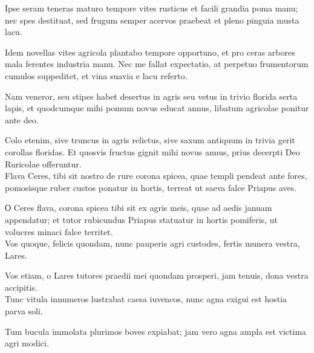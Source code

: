 {\large

\noindent Ipse seram teneras maturo tempore vites rusticus et facili grandia poma manu; nec spes destituat, sed frugum semper acervos praebeat et pleno pinguia musta lacu.\\

}

\noindent Idem novellas vites agricola plantabo tempore opportuno, et pro ceras arbores mala ferentes industria manu. Nec me fallat expectatio, at perpetuo frumentorum cumulos suppeditet, et vina suavia e lacu referto.\\

{\large

\noindent Nam veneror, seu stipes habet desertus in agris seu vetus in trivio florida serta lapis, et quodcumque mihi pomum novus educat annus, libatum agricolae ponitur ante deo.\\

}

\noindent Colo etenim, sive truncus in agris relictus, sive saxum antiquum in trivia gerit corollas floridas. Et quosvis fructus gignit mihi novus annus, prius decerpti Deo Ruricolae offeruntur. \\


{\large
\noindent Flava Ceres, tibi sit nostro de rure corona spicea, quae templi pendeat ante fores, pomosisque ruber custos ponatur in hortis, terreat ut saeva falce Priapus aves.\\

}


\noindent О Ceres flava, corona spicea tibi sit ex agris meis, quae ad aedis januam appendatur; et tutor rubicundus Priapus statuatur in hortis pomiferis, ut volucres minaci falce territet.\\ 

{\large
\noindent Vos quoque, felicis quondam, nunc pauperis agri custodes, fertis munera vestra, Lares.\\

}

\noindent Vos etiam, o Lares tutores praedii mei quondam prosperi, jam tenuis, dona vestra accipitis. \\

{\large
\noindent Tunc vitula innumeros lustrabat caesa iuvencos, nunc agna exigui est hostia parva soli.\\
}

\noindent Tum bucula immolata plurimos boves expiabat; jam vero agna ampla est victima agri modici.\\ 

